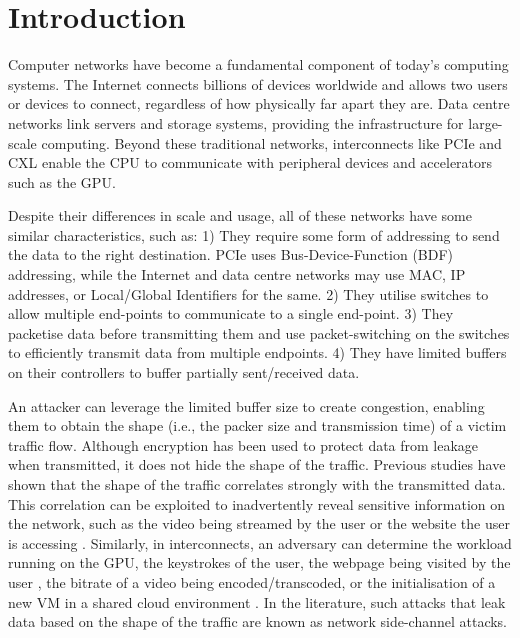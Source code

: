 
\chapter{Introduction}
\label{ch:Introduction}

Computer networks have become a fundamental component of today's computing systems.
The Internet connects billions of devices worldwide and allows two users or devices to connect, regardless of how physically far apart they are.
Data centre networks link servers and storage systems, providing the infrastructure for large-scale computing.
Beyond these traditional networks, interconnects like PCIe and CXL enable the CPU to communicate with peripheral devices and accelerators such as the GPU.

Despite their differences in scale and usage, all of these networks have some similar characteristics, such as:
1) They require some form of addressing to send the data to the right destination. PCIe uses Bus-Device-Function (BDF) addressing, while the Internet and data centre networks may use MAC, IP addresses, or Local/Global Identifiers for the same. 
2) They utilise switches to allow multiple end-points to communicate to a single end-point. 
3) They packetise data before transmitting them and use packet-switching on the switches to efficiently transmit data from multiple endpoints. 
4) They have limited buffers on their controllers to buffer partially sent/received data.

An attacker can leverage the limited buffer size to create congestion, enabling them to obtain the shape (i.e., the packer size and transmission time) of a victim traffic flow.
Although encryption has been used to protect data from leakage when transmitted, it does not hide the shape of the traffic.
Previous studies have shown that the shape of the traffic correlates strongly with the transmitted data. 
This correlation can be exploited to inadvertently reveal sensitive information on the network, such as the video being streamed by the user \cite{schuster2017beautyburst} or the website the user is accessing \cite{bhat2019varcnn, wang2014supersequence}. 
Similarly, in interconnects, an adversary can determine the workload running on the GPU, the keystrokes of the user, the webpage being visited by the user \cite{tan2021invisible}, the bitrate of a video being encoded/transcoded, or the initialisation of a new VM in a shared cloud environment \cite{giechaskiel2022cross}. 
In the literature, such attacks that leak data based on the shape of the traffic are known as network side-channel attacks.

